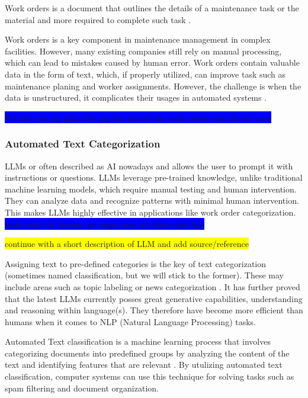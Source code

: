 \documentclass{article}
\begin{document}
Work orders is a document that outlines the details of a maintenance task or the material and more required
to complete such task \cite{ibm2023}.
\bigskip

Work orders is a key component in maintenance management in complex facilities. However, many existing companies
still rely on manual processing, which can lead to mistakes caused by human error. Work orders contain valuable
data in the form of text, which, if properly utilized, can improve task such as maintenance planing and worker assignments.
However, the challenge is when the data is unstructured, it complicates their usages in automated systems \cite{li et al.}.

\colorbox{blue}{Vet inte om jag gillar det jag har skrivit om work orders som du ser ovan}

\subsubsection{Automated Text Categorization}

LLMs or often described as AI nowadays and allows the user to prompt it with instructions or questions.
LLMs leverage pre-trained knowledge, unlike traditional machine learning models, which require
manual testing and human intervention. They can analyze data and recognize patterns with minimal
human intervention. This makes LLMs highly effective in applications like work order categorization.
\colorbox{blue}{hade svårt att komma på något mer att skriva just här}


\colorbox{yellow}{continue with a short description of LLM and add source/reference}

Assigning text to pre-defined categories is the key of text categorization
(sometimes named classification, but we will stick to the former).
These may include areas such as topic labeling or news categorization \cite{zhang2024}.
It has further proved that the latest LLMs currently posses great generative capabilities, understanding
and reasoning within language(s).
They therefore have become more efficient than humans when it comes to NLP (Natural Language Processing)
tasks.
\bigskip

Automated Text classification is a machine learning process that involves categorizing documents
into predefined groups by analyzing the content of the text and identifying features that are
relevant \cite{dalal2011}. By utulizing automated text classification, computer systems
can use this technique for solving tasks such as spam filtering and document organization.
\bigskip
\end{document}

